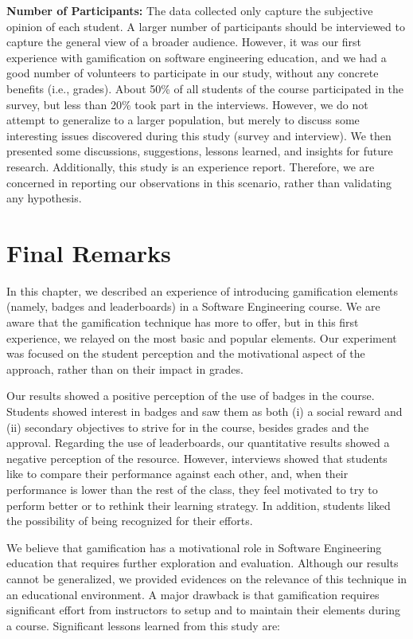 \textbf{Number of Participants:} The data collected only capture the subjective opinion of each student. A larger number of participants should be interviewed to capture the general view of a broader audience. However, it was our first experience with gamification on software engineering education, and we had a good number of volunteers to participate in our study, without any concrete benefits (i.e., grades). About 50\% of all students of the course participated in the survey, but less than 20\% took part in the interviews. However, we do not attempt to generalize to a larger population, but merely to discuss some interesting issues discovered during this study (survey and interview). We then presented some discussions, suggestions, lessons learned, and insights for future research. Additionally, this study is an experience report. Therefore, we are concerned in reporting our observations in this scenario, rather than validating any hypothesis.

\section{Final Remarks}
\label{sec:gamificationfinal}

In this chapter, we described an experience of introducing gamification elements (namely, badges and leaderboards) in a Software Engineering course. We are aware that the gamification technique has more to offer, but in this first experience, we relayed on the most basic and popular elements. Our experiment was focused on the student perception and the motivational aspect of the approach, rather than on their impact in grades.

Our results showed a positive perception of the use of badges in the course. Students showed interest in badges and saw them as both (i) a social reward and (ii) secondary objectives to strive for in the course, besides grades and the approval. Regarding the use of leaderboards, our quantitative results showed a negative perception of the resource. However, interviews showed that students like to compare their performance against each other, and, when their performance is lower than the rest of the class, they feel motivated to try to perform better or to rethink their learning strategy. In addition, students liked the possibility of being recognized for their efforts.

We believe that gamification has a motivational role in Software Engineering education that requires  further exploration and evaluation. Although our results cannot be generalized, we provided evidences on the relevance of this technique in an educational environment. A major drawback is that gamification requires significant effort from instructors to setup and to maintain their elements during a course. Significant lessons learned from this study are:

